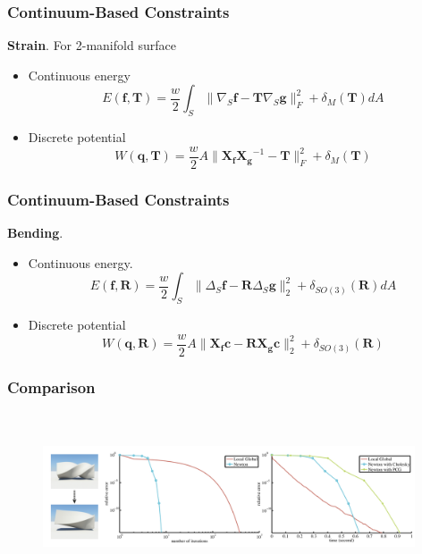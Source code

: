 \documentclass[serif,mathserif]{beamer}
\begin{document}
\begin{frame}
 \frametitle{Continuum-Based Constraints}
 \textbf{Strain}. For 2-manifold surface
    \begin{itemize}
     \item Continuous energy
      \begin{equation*}
	E(\mathbf{f}, \mathbf{T})=\frac{w}{2}\int_S\|\nabla_S \mathbf{f}-\mathbf{T}\nabla_S \mathbf{g}\|^2_F
	+\delta_M(\mathbf{T})dA
      \end{equation*}
     \item Discrete potential
      \begin{equation*}
	W(\mathbf{q}, \mathbf{T})=\frac{w}{2}A\|\mathbf{X_fX_g}^{-1}-\mathbf{T}\|^2_F+\delta_M(\mathbf{T})
      \end{equation*}
    \end{itemize}
\end{frame}

\begin{frame}
 \frametitle{Continuum-Based Constraints}
 \textbf{Bending}.
  \begin{itemize}
   \item Continuous energy.
   \begin{equation*}
    E(\mathbf{f}, \mathbf{R})=\frac{w}{2}\int_S\|\Delta_S\mathbf{f}-\mathbf{R}\Delta_S\mathbf{g}\|^2_2
    +\delta_{SO(3)}(\mathbf{R})dA
   \end{equation*}
   \item Discrete potential
   \begin{equation*}
    W(\mathbf{q}, \mathbf{R})=\frac{w}{2}A\|\mathbf{X_fc}-\mathbf{RX_gc}\|^2_2+\delta_{SO(3)}(\mathbf{R})
   \end{equation*}
  \end{itemize}
\end{frame}


\begin{frame}
  \frametitle{Comparison}
  \begin{figure}[t]
  \centering
  \includegraphics[height=5cm,width=11cm]{pic/comparison.png}
  \end{figure}
\end{frame}
\end{document}

